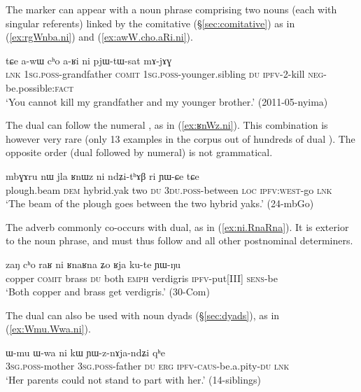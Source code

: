 The marker  can appear with a noun phrase comprising two nouns (each with singular referents) linked by the comitative  (§\ref{sec:comitative}) as in (\ref{ex:rgWnba.ni}) and (\ref{ex:awW.cho.aRi.ni}).


\begin{exe}
	\ex \label{ex:awW.cho.aRi.ni}
	\gll  tɕe a-wɯ cʰo a-ʁi ni pjɯ-tɯ-sat mɤ-jɤɣ \\
	\textsc{lnk} \textsc{1sg}.\textsc{poss}-grandfather \textsc{comit} \textsc{1sg}.\textsc{poss}-younger.sibling \textsc{du} \textsc{ipfv}-2-kill \textsc{neg}-be.possible:\textsc{fact} \\
	\glt `You cannot kill my grandfather and my younger brother.' (2011-05-nyima)
\end{exe}

The dual can follow the numeral , as in (\ref{ex:ʁnWz.ni}). This combination is however very rare (only 13 examples in the corpus out of hundreds of dual ). The opposite order (dual followed by numeral) is not grammatical.

\begin{exe}
\ex \label{ex:ʁnWz.ni}
\gll mbɣɤru nɯ jla ʁnɯz ni ndʑi-tʰɤβ ri ɲɯ-ɕe tɕe \\
plough.beam \textsc{dem} hybrid.yak two \textsc{du} \textsc{3du}.\textsc{poss}-between \textsc{loc} \textsc{ipfv}:\textsc{west}-go \textsc{lnk} \\
\glt `The beam of the plough goes between the two hybrid yaks.' (24-mbGo) 
\end{exe}


The adverb  commonly co-occurs with dual, as in (\ref{ex:ni.RnaRna}). It is exterior to the noun phrase, and must thus follow  and all other postnominal determiners.

\begin{exe}
\ex \label{ex:ni.RnaRna}
\gll zaŋ cʰo raʁ ni ʁnaʁna ʑo ʁja ku-te ɲɯ-ŋu \\
copper \textsc{comit} brass \textsc{du} both \textsc{emph} verdigris \textsc{ipfv}-put[III] \textsc{sens}-be \\
\glt `Both copper and brass get verdigris.' (30-Com)
\end{exe}

The dual can also be used with noun dyads (§\ref{sec:dyads}), as in (\ref{ex:Wmu.Wwa.ni}). 

\begin{exe}
\ex \label{ex:Wmu.Wwa.ni}
\gll   ɯ-mu ɯ-wa ni kɯ ɲɯ-z-nɤja-ndʑi qʰe \\
\textsc{3sg}.\textsc{poss}-mother \textsc{3sg}.\textsc{poss}-father \textsc{du} \textsc{erg} \textsc{ipfv}-\textsc{caus}-be.a.pity-\textsc{du} \textsc{lnk} \\
\glt `Her parents could not stand to part with her.' (14-siblings) 
\end{exe}

